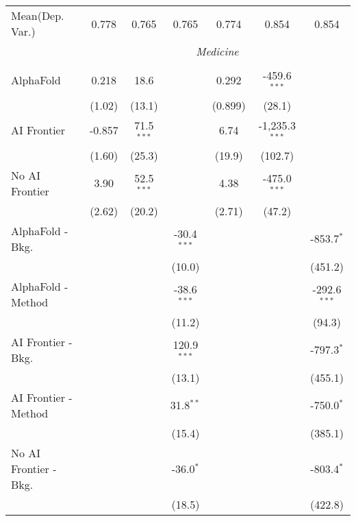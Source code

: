 \begin{tabular}{lcccccc}
Mean(Dep. Var.) & 0.778 & 0.765 & 0.765 & 0.774 & 0.854 & 0.854 \\
 & \multicolumn{6}{c}{\textit{Medicine}} \\ \\
   AlphaFold               & 0.218  & 18.6         &               & 0.292   & -459.6$^{***}$   &   \\   
                           & (1.02) & (13.1)       &               & (0.899) & (28.1)           &   \\   
   AI Frontier             & -0.857 & 71.5$^{***}$ &               & 6.74    & -1,235.3$^{***}$ &   \\   
                           & (1.60) & (25.3)       &               & (19.9)  & (102.7)          &   \\   
   No AI Frontier          & 3.90   & 52.5$^{***}$ &               & 4.38    & -475.0$^{***}$   &   \\   
                           & (2.62) & (20.2)       &               & (2.71)  & (47.2)           &   \\   
   AlphaFold - Bkg.        &        &              & -30.4$^{***}$ &         &                  & -853.7$^{*}$\\   
                           &        &              & (10.0)        &         &                  & (451.2)\\   
   AlphaFold - Method      &        &              & -38.6$^{***}$ &         &                  & -292.6$^{***}$\\   
                           &        &              & (11.2)        &         &                  & (94.3)\\   
   AI Frontier - Bkg.      &        &              & 120.9$^{***}$ &         &                  & -797.3$^{*}$\\   
                           &        &              & (13.1)        &         &                  & (455.1)\\   
   AI Frontier - Method    &        &              & 31.8$^{**}$   &         &                  & -750.0$^{*}$\\   
                           &        &              & (15.4)        &         &                  & (385.1)\\   
   No AI Frontier - Bkg.   &        &              & -36.0$^{*}$   &         &                  & -803.4$^{*}$\\   
                           &        &              & (18.5)        &         &                  & (422.8)\\   

\end{tabular}
